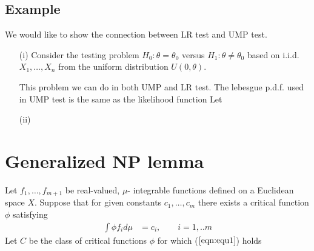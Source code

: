 \subsection{Example}
We would like to show the connection between LR test and UMP test.

\begin{itemize}
\item[(i)] Consider the testing problem $H_0: \theta = \theta_0 $ versus $H_1: \theta \neq \theta_0$ based on i.i.d. $X_1,…,X_n$ from the uniform distribution $U(0,\theta)$.

This problem we can do in both UMP and LR test. The lebesgue p.d.f. used in UMP test is the same as the likelihood function
Let 


\item[(ii)] 


\end{itemize}

\section{Generalized NP lemma}

Let $f_1, …, f_{m+1}$ be real-valued, $\mu$- integrable functions defined on a Euclidean space $X$. Suppose that for given constants $c_1, …, c_m$ there exists a critical function $\phi$ satisfying 
\begin{align}
	\label{eqn:equ1}
	\int \phi f_i d\mu &= c_i, \qquad i=1,..m
\end{align}
Let $C$ be the class of critical functions $\phi$ for which ($\ref{eqn:equ1}$) holds


